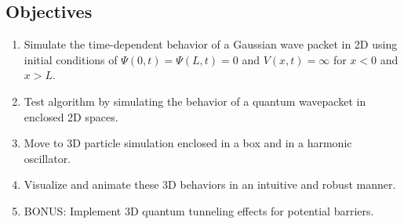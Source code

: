 \documentclass[11pt, letterpaper]{article}
\begin{document}
\subsection*{Objectives}

\begin{enumerate}[noitemsep, topsep=0pt, parsep=0pt, partopsep=0pt]
\item Simulate the time-dependent behavior of a Gaussian wave packet in 2D using initial conditions of $\Psi(0, t) = \Psi(L, t) = 0$ and $V(x, t) = \infty$ for $x < 0$ and $x > L$.
\item Test algorithm by simulating the behavior of a quantum wavepacket in enclosed 2D spaces.
\item Move to 3D particle simulation enclosed in a box and in a harmonic oscillator.
\item Visualize and animate these 3D behaviors in an intuitive and robust manner.
\item BONUS: Implement 3D quantum tunneling effects for potential barriers.
\end{enumerate}
\end{document}
